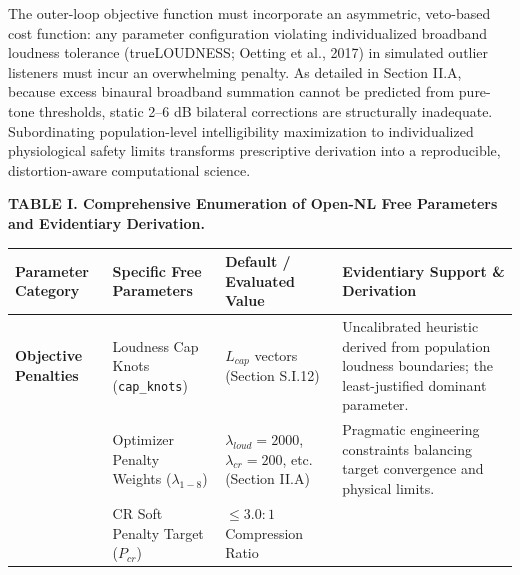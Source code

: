 \documentclass[
  12pt,
]{article}
\begin{document}
The outer-loop objective function must incorporate an asymmetric,
veto-based cost function: any parameter configuration violating
individualized broadband loudness tolerance (trueLOUDNESS; Oetting et
al., 2017) in simulated outlier listeners must incur an overwhelming
penalty. As detailed in Section II.A, because excess binaural broadband
summation cannot be predicted from pure-tone thresholds, static 2--6 dB
bilateral corrections are structurally inadequate. Subordinating
population-level intelligibility maximization to individualized
physiological safety limits transforms prescriptive derivation into a
reproducible, distortion-aware computational science.

\textbf{TABLE I. Comprehensive Enumeration of Open-NL Free Parameters
and Evidentiary Derivation.}

\begin{longtable}[]{@{}
  >{\raggedright\arraybackslash}p{}
  >{\raggedright\arraybackslash}p{}
  >{\raggedright\arraybackslash}p{}
  >{\raggedright\arraybackslash}p{}@{}}
\toprule\noalign{}
\begin{minipage}[b]{\linewidth}\raggedright
Parameter Category
\end{minipage} & \begin{minipage}[b]{\linewidth}\raggedright
Specific Free Parameters
\end{minipage} & \begin{minipage}[b]{\linewidth}\raggedright
Default / Evaluated Value
\end{minipage} & \begin{minipage}[b]{\linewidth}\raggedright
Evidentiary Support \& Derivation
\end{minipage} \\
\midrule\noalign{}
\endhead
\bottomrule\noalign{}
\endlastfoot
\textbf{Objective Penalties} & Loudness Cap Knots (\texttt{cap\_knots})
& \(L_{cap}\) vectors (Section S.I.12) & Uncalibrated heuristic derived
from population loudness boundaries; the least-justified dominant
parameter. \\
& Optimizer Penalty Weights (\(\lambda_{1-8}\)) &
\(\lambda_{loud}=2000\), \(\lambda_{cr}=200\), etc. (Section II.A) &
Pragmatic engineering constraints balancing target convergence and
physical limits. \\
& CR Soft Penalty Target (\(P_{cr}\)) & \(\le 3.0:1\) Compression Ratio

\end{longtable}
\end{document}
